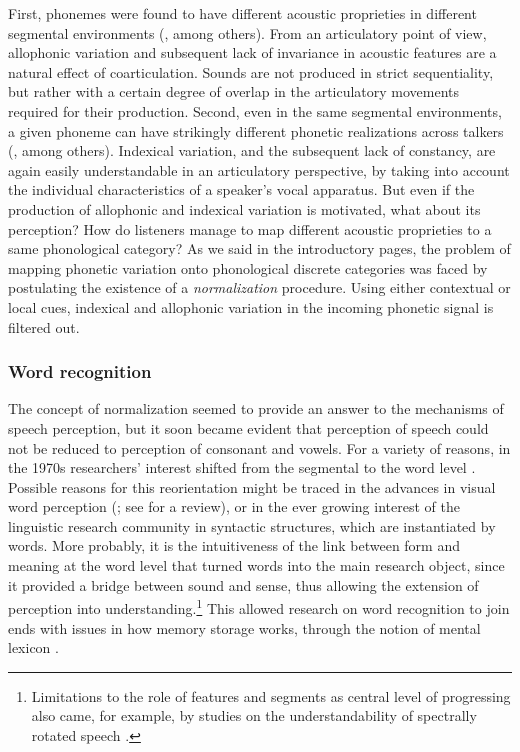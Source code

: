 First, phonemes were found to have different acoustic proprieties in different segmental environments (\citealt{delattre1955acoustic}, among others). From an articulatory point of view, allophonic variation and subsequent lack of invariance in acoustic features are a natural effect of coarticulation. Sounds are not produced in strict sequentiality, but rather with a certain degree of overlap in the articulatory movements required for their production. Second, even in the same segmental environments, a given phoneme can have strikingly different phonetic realizations across talkers (\citealt{peterson1952control}, among others). Indexical variation, and the subsequent lack of constancy, are again easily understandable in an articulatory perspective, by taking into account the individual characteristics of a speaker's vocal apparatus. But even if the production of allophonic and indexical variation is motivated, what about its perception? How do listeners manage to map different acoustic proprieties to a same phonological category? As we said in the introductory pages, the problem of mapping phonetic variation onto phonological discrete categories was faced by postulating the existence of a \textit{normalization} procedure. Using either contextual \citep{ladefoged1957information} or local \citep{stevens1960model} cues, indexical and allophonic variation in the incoming phonetic signal is filtered out. 

\subsubsection{Word recognition}\label{sec1112}
The concept of normalization seemed to provide an answer to the mechanisms of speech perception, but it soon became evident that perception of speech could not be reduced to perception of consonant and vowels. For a variety of reasons, in the 1970s researchers' interest shifted from the segmental to the word level \citep{marslen1978processing}. Possible reasons for this reorientation might be traced in the advances in visual word perception (\citealt{wheeler1970processes}; see \citealt{balota1994visual} for a review), or in the ever growing interest of the linguistic research community in syntactic structures, which are instantiated by words. More probably, it is the intuitiveness of the link between form and meaning at the word level that turned words into the main research object, since it provided a bridge between sound and sense, thus allowing the extension of perception into understanding.\footnote{Limitations to the role of features and segments as central level of progressing also came, for example, by studies on the understandability of spectrally rotated speech \citep{blesser1972speech}.} This allowed research on word recognition to join ends with issues in how memory storage works, through the notion of mental lexicon \citep{oldfield1966things}.

